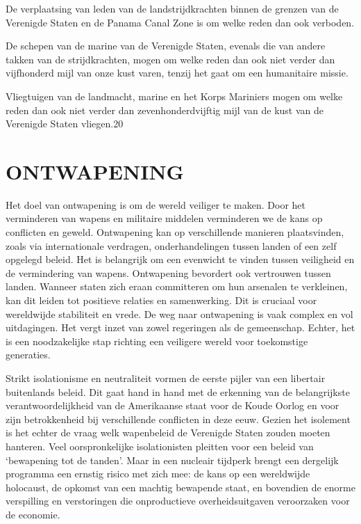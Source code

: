 \documentclass[
  a5paper,
  smalldemyvopaper,10pt,twoside,onecolumn,openright,extrafontsizes,hidelinks]{memoir}
\renewenvironment{quote}%
               {\list{}{\rightmargin=.6cm\leftmargin=.6cm}%
                \itshape \item[]}%
               {\endlist}
\begin{document}
\begin{quote}
De verplaatsing van leden van de landstrijdkrachten binnen de grenzen
van de Verenigde Staten en de Panama Canal Zone is om welke reden dan
ook verboden.

De schepen van de marine van de Verenigde Staten, evenals die van andere
takken van de strijdkrachten, mogen om welke reden dan ook niet verder
dan vijfhonderd mijl van onze kust varen, tenzij het gaat om een
humanitaire missie.

Vliegtuigen van de landmacht, marine en het Korps Mariniers mogen om
welke reden dan ook niet verder dan zevenhonderdvijftig mijl van de kust
van de Verenigde Staten vliegen.20
\end{quote}

\section{\texorpdfstring{\textbf{ONTWAPENING}}{ONTWAPENING}}\label{ontwapening}

Het doel van ontwapening is om de wereld veiliger te maken. Door het
verminderen van wapens en militaire middelen verminderen we de kans op
conflicten en geweld. Ontwapening kan op verschillende manieren
plaatsvinden, zoals via internationale verdragen, onderhandelingen
tussen landen of een zelf opgelegd beleid. Het is belangrijk om een
evenwicht te vinden tussen veiligheid en de vermindering van wapens.
Ontwapening bevordert ook vertrouwen tussen landen. Wanneer staten zich
eraan committeren om hun arsenalen te verkleinen, kan dit leiden tot
positieve relaties en samenwerking. Dit is cruciaal voor wereldwijde
stabiliteit en vrede. De weg naar ontwapening is vaak complex en vol
uitdagingen. Het vergt inzet van zowel regeringen als de gemeenschap.
Echter, het is een noodzakelijke stap richting een veiligere wereld voor
toekomstige generaties.

Strikt isolationisme en neutraliteit vormen de eerste pijler van een
libertair buitenlands beleid. Dit gaat hand in hand met de erkenning van
de belangrijkste verantwoordelijkheid van de Amerikaanse staat voor de
Koude Oorlog en voor zijn betrokkenheid bij verschillende conflicten in
deze eeuw. Gezien het isolement is het echter de vraag welk wapenbeleid
de Verenigde Staten zouden moeten hanteren. Veel oorspronkelijke
isolationisten pleitten voor een beleid van `bewapening tot de tanden'.
Maar in een nucleair tijdperk brengt een dergelijk programma een ernstig
risico met zich mee: de kans op een wereldwijde holocaust, de opkomst
van een machtig bewapende staat, en bovendien de enorme verspilling en
verstoringen die onproductieve overheidsuitgaven veroorzaken voor de
economie.
\end{document}
